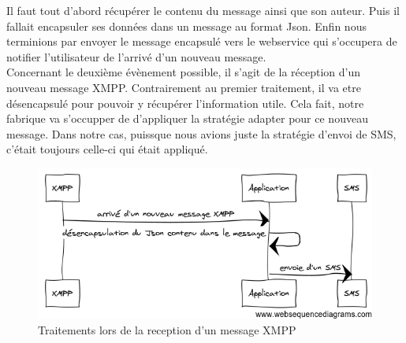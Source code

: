 Il faut tout d'abord récupérer le contenu du message ainsi que son auteur. Puis il fallait encapsuler 
ses données dans un message au format Json. Enfin nous terminions par envoyer le message encapsulé vers 
le webservice qui s'occupera de notifier l'utilisateur de l'arrivé d'un nouveau message.
\\
Concernant le deuxième évènement possible, il s'agit de la réception d'un nouveau message XMPP. Contrairement
au premier traitement, il va etre désencapsulé pour pouvoir y récupérer l'information utile. Cela fait, 
notre fabrique va s'occupper de d'appliquer la stratégie adapter pour ce nouveau message. Dans notre cas, 
puissque nous avions juste la stratégie d'envoi de SMS, c'était toujours celle-ci qui était appliqué.


\begin{figure}[!h]
	\center
	\includegraphics[width=12cm]{img/desencapsulation.png}
	\caption{Traitements lors de la reception d'un message XMPP}
\end{figure}


